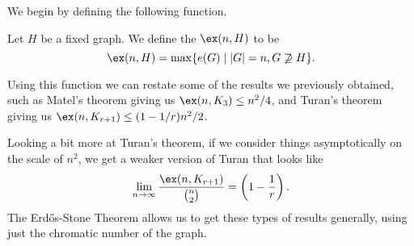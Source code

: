 \documentclass[a4paper]{scrartcl}
\begin{document}
We begin by defining the following function.

\begin{definition}
	Let $H$ be a fixed graph. We define the  $\ex(n, H)$ to be
	$$\ex(n, H) = \max\{e(G) \mid |G| = n, G \not\supseteq H\}.$$
\end{definition}

Using this function we can restate some of the results we previously obtained, such as Matel's theorem giving us $\ex(n, K_3) \leq n^2/4$, and Turan's theorem giving us $\ex(n, K_{r + 1}) \leq (1 - 1/r)n^2/2$. 

Looking a bit more at Turan's theorem, if we consider things asymptotically on the scale of $n^2$, we get a weaker version of Turan that looks like
$$
\lim_{n \to \infty} \frac{\ex(n, K_{r + 1})}{\binom{n}{2}} = \left(1 - \frac 1r\right).
$$
The Erdős-Stone Theorem allows us to get these types of results generally, using just the chromatic number of the graph.
\end{document}
